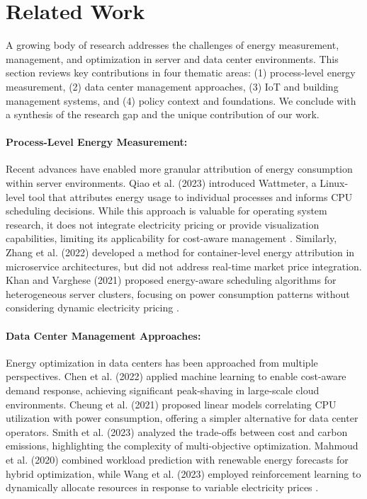 

\section{Related Work}
\label{related_work:related-work}
A growing body of research addresses the challenges of energy measurement, management, and optimization in server and data center environments. This section reviews key contributions in four thematic areas: (1) process-level energy measurement, (2) data center management approaches, (3) IoT and building management systems, and (4) policy context and foundations. We conclude with a synthesis of the research gap and the unique contribution of our work.
\paragraph{\textbf{Process-Level Energy Measurement:}}
Recent advances have enabled more granular attribution of energy consumption within server environments. Qiao et al. (2023) introduced Wattmeter, a Linux-level tool that attributes energy usage to individual processes and informs CPU scheduling decisions. While this approach is valuable for operating system research, it does not integrate electricity pricing or provide visualization capabilities, limiting its applicability for cost-aware management \cite{qiao2023wattmeter}. Similarly, Zhang et al. (2022) developed a method for container-level energy attribution in microservice architectures, but did not address real-time market price integration. Khan and Varghese (2021) proposed energy-aware scheduling algorithms for heterogeneous server clusters, focusing on power consumption patterns without considering dynamic electricity pricing \cite{zhang2022container,khan2021energy}.
\paragraph{\textbf{Data Center Management Approaches:}}
Energy optimization in data centers has been approached from multiple perspectives. Chen et al. (2022) applied machine learning to enable cost-aware demand response, achieving significant peak-shaving in large-scale cloud environments. Cheung et al. (2021) proposed linear models correlating CPU utilization with power consumption, offering a simpler alternative for data center operators. Smith et al. (2023) analyzed the trade-offs between cost and carbon emissions, highlighting the complexity of multi-objective optimization. Mahmoud et al. (2020) combined workload prediction with renewable energy forecasts for hybrid optimization, while Wang et al. (2023) employed reinforcement learning to dynamically allocate resources in response to variable electricity prices \cite{chen2022datacentermodel,cheung2021utilizationmodel,smith2023warofefficiencies,mahmoud2020cost,wang2023reinforcement}.
